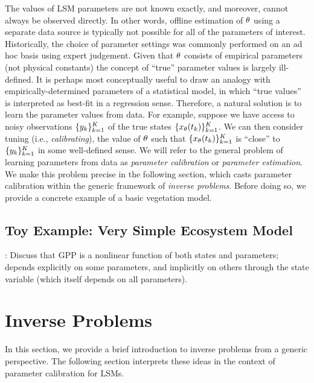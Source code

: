 \documentclass[12pt]{article}
\begin{document}
The values of LSM parameters are not known exactly, and moreover, cannot always be observed directly. In other words, offline estimation of $\theta$
using a separate data source is typically not possible for all of the parameters of interest. Historically, the choice of parameter settings 
was commonly performed on an ad hoc basis using expert judgement. 
Given that $\theta$ consists of empirical parameters 
(not physical constants) the concept of ``true'' parameter values is largely ill-defined. It is perhaps most conceptually useful to draw an 
analogy with empirically-determined parameters of a statistical model, in which ``true values'' is interpreted as best-fit in a regression sense.
Therefore, a natural solution is to learn the parameter values from data. For example, suppose we have access to noisy observations 
$\{{y}_{k}\}_{k=1}^{K}$ of the true states 
$\{x_{\theta}({t}_{k})\}_{k=1}^{K}$. 
We can then consider tuning (i.e., \textit{calibrating}), the value of $\theta$ such that $\{x_{\theta}({t}_{k})\}_{k=1}^{K}$
is ``close'' to $\{{y}_{k}\}_{k=1}^{K}$  in some well-defined sense. We will refer to the 
general problem of learning parameters from data as \textit{parameter calibration} or \textit{parameter estimation}. We make this 
problem precise in the following section, which casts parameter calibration within the generic framework of \textit{inverse problems}. Before 
doing so, we provide a concrete example of a basic vegetation model. 

\subsection{Toy Example: Very Simple Ecosystem Model}
\todo: Discuss that GPP is a nonlinear function of both states and parameters; depends explicitly on some parameters, and implicitly on others through the 
state variable (which itself depends on all parameters). 

\section{Inverse Problems}
In this section, we provide a brief introduction to inverse problems from a generic perspective. The following section 
interprets these ideas in the context of parameter calibration for LSMs. 
\end{document}
